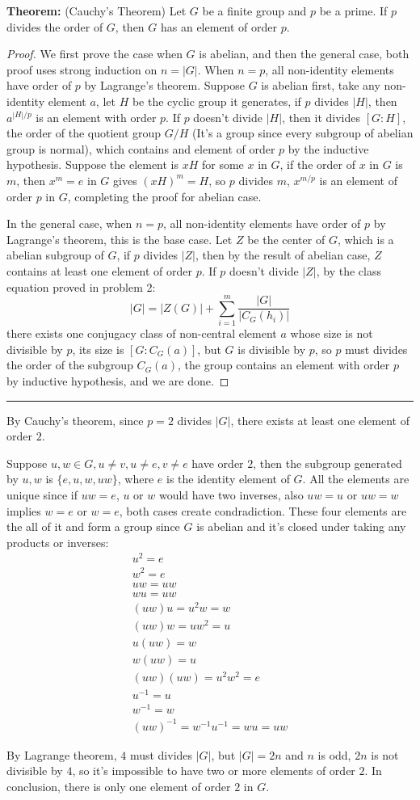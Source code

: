 \documentclass[12pt]{article}
\begin{document}
\noindent\textbf{Theorem: }(Cauchy's Theorem) Let $G$ be a finite group and $p$ be a prime. If $p$ divides the order of $G$, then $G$ has an element of order $p$.

\begin{proof}
We first prove the case when $G$ is abelian, and then the general case, both proof uses strong induction on $n=|G|$. When $n=p$, all non-identity elements have order of $p$ by Lagrange's theorem. Suppose $G$ is abelian first, take any non-identity element $a$, let $H$ be the cyclic group it generates, if $p$ divides $|H|$, then $a^{|H|/p}$ is an element with order $p$. If $p$ doesn't divide $|H|$, then it divides $[G:H]$, the order of the quotient group $G/H$ (It's a group since every subgroup of abelian group is normal), which contains and element of order $p$ by the inductive hypothesis. Suppose the element is $xH$ for some $x$ in $G$, if the order of $x$ in $G$ is $m$, then $x^m=e$ in $G$ gives $(xH)^m=H$, so $p$ divides $m$, $x^{m/p}$ is an element of order $p$ in $G$, completing the proof for abelian case.

In the general case, when $n=p$, all non-identity elements have order of $p$ by Lagrange's theorem, this is the base case. Let $Z$ be the center of $G$, which is a abelian subgroup of $G$, if $p$ divides $|Z|$, then by the result of abelian case, $Z$ contains at least one element of order $p$. If $p$ doesn't divide $|Z|$, by the class equation proved in problem 2:
$$|G|=|Z(G)|+\displaystyle\sum^m_{i=1}\frac{|G|}{|C_G(h_i)|}$$
there exists one conjugacy class of non-central element $a$ whose size is not divisible by $p$, its size is $[G:C_G(a)]$, but $G$ is divisible by $p$, so $p$ must divides the order of the subgroup $C_G(a)$, the group contains an element with order $p$ by inductive hypothesis, and we are done.
\end{proof}

\noindent\rule{\textwidth}{1pt}

By Cauchy's theorem, since $p=2$ divides $|G|$, there exists at least one element of order $2$.

Suppose $u,w\in G,u\ne v,u\ne e,v\ne e$ have order $2$, then the subgroup generated by $u,w$ is $\{e,u,w,uw\}$, where $e$ is the identity element of $G$. All the elements are unique since if $uw=e$, $u$ or $w$ would have two inverses, also $uw=u$ or $uw=w$ implies $w=e$ or $w=e$, both cases create condradiction. These four elements are the all of it and form a group since $G$ is abelian and it's closed under taking any products or inverses:
\begin{align*}
    u^2=e \\
    w^2=e \\
    uw=uw \\
    wu=uw \\
    (uw)u=u^2w=w \\
    (uw)w=uw^2=u \\
    u(uw)=w \\
    w(uw)=u \\
    (uw)(uw)=u^2w^2=e \\
    u^{-1}=u \\
    w^{-1}=w\\
    (uw)^{-1}=w^{-1}u^{-1}=wu=uw
\end{align*}

 By Lagrange theorem, $4$ must divides $|G|$, but $|G|=2n$ and $n$ is odd, $2n$ is not divisible by $4$, so it's impossible to have two or more elements of order $2$. In conclusion, there is only one element of order $2$ in $G$.
\end{document}
